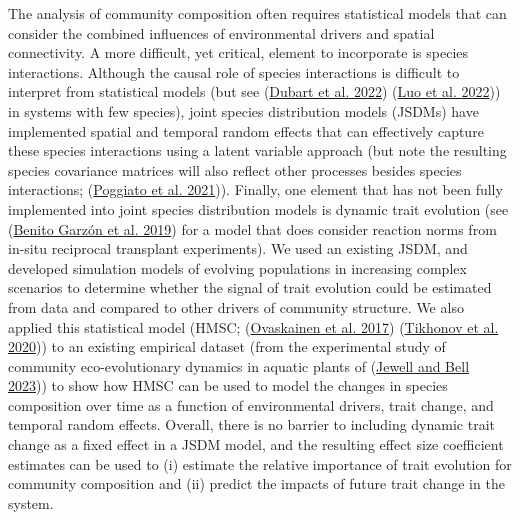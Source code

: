 \documentclass[
]{article}
\begin{document}
The analysis of community composition often requires statistical models that can consider the combined influences of environmental drivers and spatial connectivity. A more difficult, yet critical, element to incorporate is species interactions. Although the causal role of species interactions is difficult to interpret from statistical models (but see (\protect\hyperlink{ref-Dubart2022}{Dubart et al. 2022}) (\protect\hyperlink{ref-Luo2022}{Luo et al. 2022})) in systems with few species), joint species distribution models (JSDMs) have implemented spatial and temporal random effects that can effectively capture these species interactions using a latent variable approach (but note the resulting species covariance matrices will also reflect other processes besides species interactions; (\protect\hyperlink{ref-Poggiato2021}{Poggiato et al. 2021})). Finally, one element that has not been fully implemented into joint species distribution models is dynamic trait evolution (see (\protect\hyperlink{ref-Garzon2019}{Benito Garzón et al. 2019}) for a model that does consider reaction norms from in-situ reciprocal transplant experiments). We used an existing JSDM, and developed simulation models of evolving populations in increasing complex scenarios to determine whether the signal of trait evolution could be estimated from data and compared to other drivers of community structure. We also applied this statistical model (HMSC; (\protect\hyperlink{ref-Ovaskainen2017HMSC}{Ovaskainen et al. 2017}) (\protect\hyperlink{ref-Tikhonov2020}{Tikhonov et al. 2020})) to an existing empirical dataset (from the experimental study of community eco-evolutionary dynamics in aquatic plants of (\protect\hyperlink{ref-Jewell2023}{Jewell and Bell 2023})) to show how HMSC can be used to model the changes in species composition over time as a function of environmental drivers, trait change, and temporal random effects. Overall, there is no barrier to including dynamic trait change as a fixed effect in a JSDM model, and the resulting effect size coefficient estimates can be used to (i) estimate the relative importance of trait evolution for community composition and (ii) predict the impacts of future trait change in the system.
\end{document}
